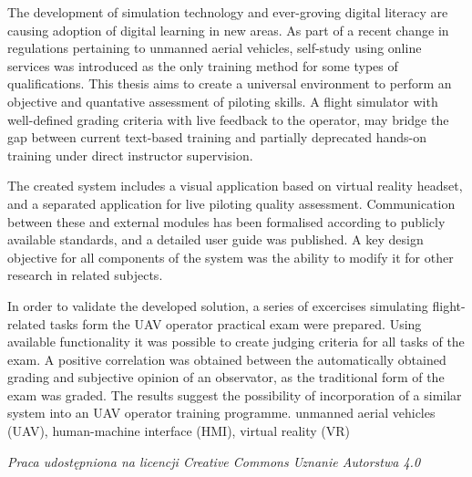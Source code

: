 \documentclass[
    a4paper,
    left=25mm,         %
    right=25mm,        %
    top=25mm,          %
    bottom=25mm,         %
    bindingoffset=5mm,  %
    nohyphenation=false %
]{src/wut-thesis}
\begin{document}
\newpage
\abstract The development of simulation technology and ever-groving digital literacy are causing adoption of digital learning in new areas. As part of a recent change in regulations pertaining to unmanned aerial vehicles, self-study using online services was introduced as the only training method for some types of qualifications. This thesis aims to create a universal environment to perform an objective and quantative assessment of piloting skills. A flight simulator with well-defined grading criteria with live feedback to the operator, may bridge the gap between current text-based training and partially deprecated hands-on training under direct instructor supervision.

The created system includes a visual application based on virtual reality headset, and a separated application for live piloting quality assessment. Communication between these and external modules has been formalised according to publicly available standards, and a detailed user guide was published. A key design objective for all components of the system was the ability to modify it for other research in related subjects.

In order to validate the developed solution, a series of excercises simulating flight-related tasks form the UAV operator practical exam were prepared. Using available functionality it was possible to create judging criteria for all tasks of the exam. A positive correlation was obtained between the automatically obtained grading and subjective opinion of an observator, as the traditional form of the exam was graded. The results suggest the possibility of incorporation of a similar system into an UAV operator training programme.
\keywords unmanned aerial vehicles (UAV), human-machine interface (HMI), virtual reality (VR)

\cleardoublepage  %
\pagestyle{plain}
\makeauthorship

\cleardoublepage %
{
  \noindent
  \emph{Praca udostępniona na licencji Creative Commons Uznanie Autorstwa 4.0 \cite{lic:ccby}}
}
\tableofcontents

\cleardoublepage %
\pagestyle{headings}
\end{document}
